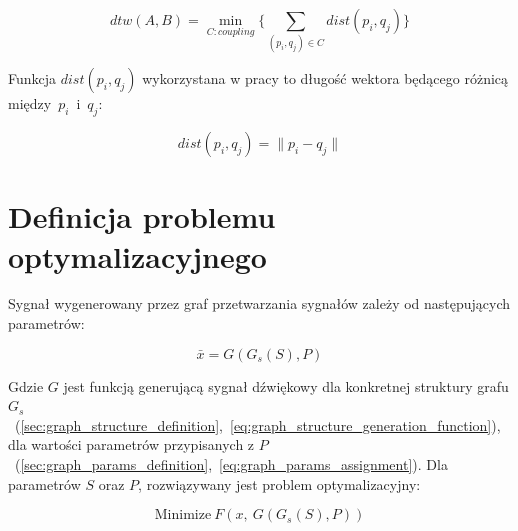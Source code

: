\begin{equation}
  dtw(A,B) = \min_{C: coupling} \{ \sum_{(p_i, q_j) \in C} dist(p_i, q_j) \}
  \label{eq:dtw_distance}
\end{equation}

Funkcja $dist(p_i, q_j)$ wykorzystana w pracy to długość wektora będącego 
różnicą między~$p_i$~i~$q_j$:

\begin{equation}
  dist(p_i, q_j) = \|p_i - q_j\|
  \label{eq:dtw_dist_function}
\end{equation}

\section{Definicja problemu optymalizacyjnego}

Sygnał wygenerowany przez graf przetwarzania sygnałów zależy od następujących parametrów:

\begin{equation}
  \bar{x} = G(G_s(S), P)
  \label{eq:graph_generated_signal}
\end{equation}

\noindent
Gdzie $G$ jest funkcją generującą sygnał dźwiękowy dla konkretnej struktury grafu
$G_s$~(\ref{sec:graph_structure_definition},~\ref{eq:graph_structure_generation_function}),
dla wartości parametrów przypisanych z
$P$~(\ref{sec:graph_params_definition},~\ref{eq:graph_params_assignment}).
Dla parametrów $S$ oraz $P$,
rozwiązywany jest problem optymalizacyjny:

\begin{equation}
  \text{Minimize}~F(x,~G(G_s(S), P))
  \label{eq:target_function}
\end{equation}

